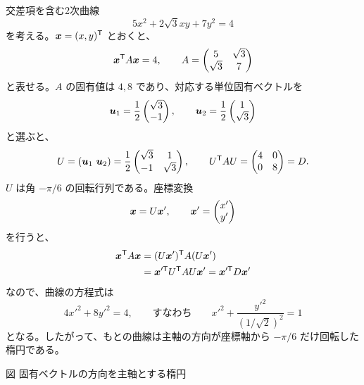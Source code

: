 交差項を含む2次曲線
\begin{equation}
 5x^2+2\sqrt3xy+7y^2=4
\end{equation}
を考える。$\bm{x}=(x,y)^{\mathsf T}$ とおくと、
\[
 \bm{x}^{\mathsf T}A\bm{x}=4,\qquad
 A=\begin{pmatrix}5&\sqrt3\\\sqrt3&7\end{pmatrix}
\]
と表せる。$A$ の固有値は $4,8$ であり、対応する単位固有ベクトルを
\[
 \bm{u}_1=\frac12\begin{pmatrix}\sqrt3\\-1\end{pmatrix},
 \qquad
 \bm{u}_2=\frac12\begin{pmatrix}1\\\sqrt3\end{pmatrix}
\]
と選ぶと、
\[
 U=(\bm{u}_1\ \bm{u}_2)
 =\frac12\begin{pmatrix}\sqrt3&1\\-1&\sqrt3\end{pmatrix},
 \qquad
 U^{\mathsf T}AU=\begin{pmatrix}4&0\\0&8\end{pmatrix}=D.
\]
$U$ は角 $-\pi/6$ の回転行列である。座標変換
\[
 \bm{x}=U\bm{x}',\qquad
 \bm{x}'=\begin{pmatrix}x'\\y'\end{pmatrix}
\]
を行うと、
\begin{align*}
 \bm{x}^{\mathsf T}A\bm{x}
 &=(U\bm{x}')^{\mathsf T}A(U\bm{x}')\\
 &=\bm{x}'^{\mathsf T}U^{\mathsf T}AU\bm{x}'
 =\bm{x}'^{\mathsf T}D\bm{x}'
\end{align*}
なので、曲線の方程式は
\[
 4{x'}^2+8{y'}^2=4,
 \qquad\text{すなわち}\qquad
 \boxed{{x'}^2+\frac{{y'}^2}{(1/\sqrt2)^2}=1}
\]
となる。したがって、もとの曲線は主軸の方向が座標軸から
$-\pi/6$ だけ回転した楕円である。

\begin{center}
\centering
{}

\smallskip
{}\small 図\thefigure\quad
固有ベクトルの方向を主軸とする楕円
\end{center}
